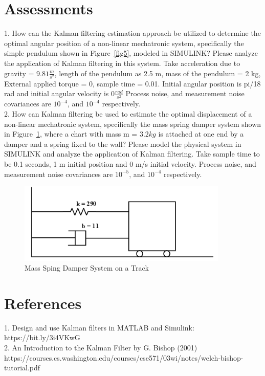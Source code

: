 \documentclass{article}
\begin{document}
\section{Assessments}
1. How can the Kalman filtering estimation approach be utilized to determine the optimal angular position of a non-linear mechatronic system, specifically the simple pendulum shown in Figure~\ref{fig5}, modeled in SIMULINK? Please analyze the application of Kalman filtering in this system. Take acceleration due to gravity = $9.81\frac{m}{s^{2}}$, length of the pendulum as 2.5 m, mass of the pendulum = 2 kg, External applied torque = 0, sample time = 0.01. Initial angular position is pi/18 rad and initial angular velocity is $0\frac{rad}{s^{2}}$ Process noise, and measurement noise covariances are $10^{-4}$, and  $10^{-4}$ respectively.\\

2. How can Kalman filtering be used to estimate the optimal displacement of a non-linear mechatronic system, specifically the mass spring damper system shown in Figure~\ref{fig6}, where a chart with mass m = $3.2 kg$ is attached at one end by a damper and a spring fixed to the wall? Please model the physical system in SIMULINK and analyze the application of Kalman filtering. Take sample time to be 0.1 seconds, 1 m initial position and 0 m/s initial velocity. Process noise, and measurement noise covariances are $10^{-5}$, and  $10^{-4}$ respectively.

\begin{figure}[h!]
\begin{center}
\includegraphics[width=10.0cm]{damp_spring}
\caption{Mass Sping Damper System on a Track}
\label{fig6}
\end{center}
\end{figure}

\section{References}

1. Design and use Kalman filters in MATLAB and Simulink: https://bit.ly/3i4VKwG\\
2. An Introduction to the Kalman Filter by G. Bishop (2001) https://courses.cs.washington.edu/courses/cse571/03wi/notes/welch-bishop-tutorial.pdf 
\end{document}
